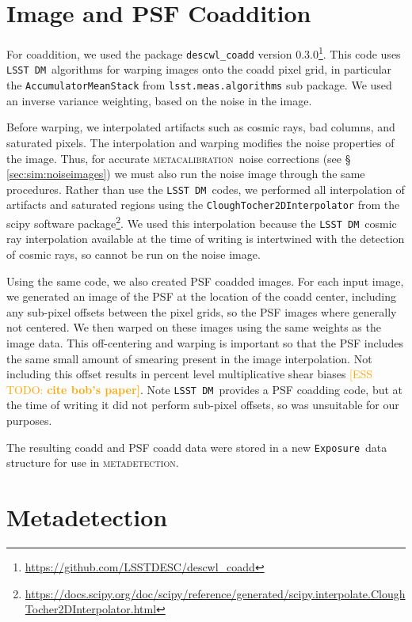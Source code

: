 \documentclass[iop, twocolappendix, appendixfloats, numberedappendix, apj]{hackemulateapj}
\newcommand{\esstodo}[1]{\textcolor{orange}{[ESS TODO: \bf #1]}}
\newcommand{\calexp}{\texttt{Exposure}}
\newcommand{\dm}{\texttt{LSST DM}}
\newcommand{\mcal}{\textsc{metacalibration}}
\newcommand{\mdet}{\textsc{metadetection}}
\begin{document}
\section{Image and PSF Coaddition} \label{sec:coadding}

For coaddition, we used the package \texttt{descwl\_coadd} version
0.3.0\footnote{\url{https://github.com/LSSTDESC/descwl_coadd}}.  This code uses
\dm\ algorithms for warping images onto the coadd pixel grid, in particular the
\texttt{AccumulatorMeanStack} from \texttt{lsst.meas.algorithms} sub package.
We used an inverse variance weighting, based on the noise in the image.

Before warping, we interpolated artifacts such as cosmic rays, bad columns, and
saturated pixels.  The interpolation and warping modifies the noise properties
of the image.  Thus, for accurate \mcal\ noise corrections (see \S
\ref{sec:sim:noiseimages}) we must also run the noise image through the same
procedures.  Rather than use the \dm\ codes, we performed all interpolation of
artifacts and saturated regions using the \texttt{CloughTocher2DInterpolator}
from the scipy software
package\footnote{\url{https://docs.scipy.org/doc/scipy/reference/generated/scipy.interpolate.CloughTocher2DInterpolator.html}}.
We used this interpolation because the \dm\ cosmic ray interpolation available
at the time of writing is intertwined with the detection of cosmic rays, so
cannot be run on the noise image.

Using the same code, we also created PSF coadded images.  For each input image,
we generated an image of the PSF at the location of the coadd center, including
any sub-pixel offsets between the pixel grids, so the PSF images where
generally not centered.  We then warped on these images using the same weights
as the image data.  This off-centering and warping is important so that the PSF
includes the same small amount of smearing present in the image interpolation.
Not including this offset results in percent level multiplicative shear biases
\esstodo{cite bob's paper}.  Note \dm\ provides a PSF coadding code, but at the
time of writing it did not perform sub-pixel offsets, so was unsuitable for
our purposes.

The resulting coadd and PSF coadd data were stored in a new \calexp\ data
structure for use in \mdet.

\section{Metadetection} \label{sec:mdet}
\end{document}
